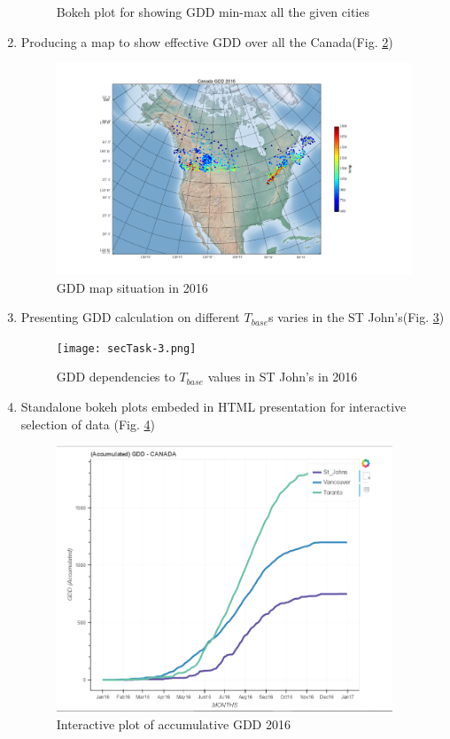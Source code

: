 \documentclass{article}
\begin{document}
\begin{enumerate}
\begin{center}
\begin{figure}[H]
\caption{Bokeh plot for showing GDD min-max all the given cities}
\label{bokeh_min-max}
\end{figure}
\end{center}
\item Producing  a map to show effective GDD over  all the Canada(Fig. \ref{gdd_map})
\begin{center}
\begin{figure}[H]
\includegraphics[width=4.25in]{map_shadedrelief.png}
\caption{GDD map situation in 2016}
\label{gdd_map}
\end{figure}
\end{center}
\item Presenting GDD calculation on different $T_{base}$s  varies in the ST John's(Fig. \ref{gdd_diff-tbase})
\begin{center}
\begin{figure}[H]
\texttt{[image: secTask-3.png]}
\caption{GDD dependencies to $T_{base}$ values in ST John's in 2016}
\label{gdd_diff-tbase}
\end{figure}
\end{center}

\item Standalone bokeh plots embeded in HTML presentation for interactive selection of data (Fig. \ref{gdd_interactive})
\begin{center}
\begin{figure}[H]
\includegraphics[width=3.95in]{secTask-4.png}
\caption{Interactive plot of accumulative GDD 2016}
\label{gdd_interactive}
\end{figure}
\end{center}


\end{enumerate}
\end{document}

